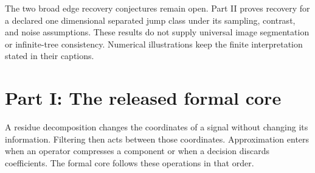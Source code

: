 \documentclass[11pt,letterpaper]{article}
\theoremstyle{plain}
\theoremstyle{plain}
\theoremstyle{plain}
\theoremstyle{definition}
\theoremstyle{definition}
\theoremstyle{definition}
\theoremstyle{definition}
\theoremstyle{remark}
\theoremstyle{remark}
\theoremstyle{remark}
\theoremstyle{remark}
\begin{document}
The two broad edge recovery conjectures remain open. Part II proves recovery for a declared one dimensional separated jump class under its sampling, contrast, and noise assumptions. These results do not supply universal image segmentation or infinite-tree consistency. Numerical illustrations keep the finite interpretation stated in their captions.
\clearpage
\tableofcontents
\clearpage
\listoffigures
\listoftables
\clearpage
{}
\part*{Part I: The released formal core}
\begin{readerroadmap}[title={Coordinates first, decisions second}]
A residue decomposition changes the coordinates of a signal without changing its information. Filtering then acts between those coordinates. Approximation enters when an operator compresses a component or when a decision discards coefficients. The formal core follows these operations in that order.
\end{readerroadmap}
\end{document}
